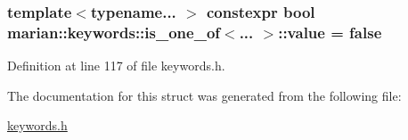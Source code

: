 \subsubsection[{\texorpdfstring{value}{value}}]{\setlength{\rightskip}{0pt plus 5cm}template$<$typename... $>$ constexpr bool {\bf marian\+::keywords\+::is\+\_\+one\+\_\+of}$<$... $>$\+::value = false\hspace{0.3cm}{\ttfamily [static]}}\hypertarget{structmarian_1_1keywords_1_1is__one__of_a976c4f5f1d85eaac00d57ffe185200dd}{}\label{structmarian_1_1keywords_1_1is__one__of_a976c4f5f1d85eaac00d57ffe185200dd}


Definition at line 117 of file keywords.\+h.



The documentation for this struct was generated from the following file\+:\begin{DoxyCompactItemize}
\item 
\hyperlink{keywords_8h}{keywords.\+h}\end{DoxyCompactItemize}

